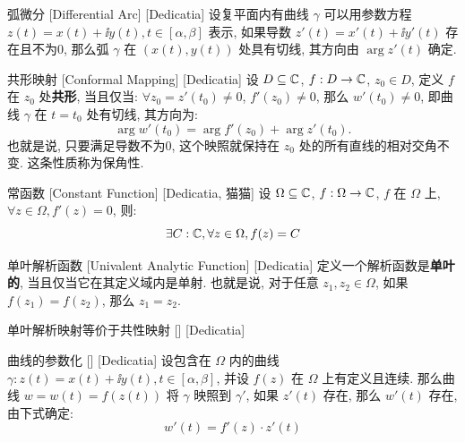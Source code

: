         \begin{dfn}
            {弧微分}
            [Differential Arc]
            [Dedicatia]
            设复平面内有曲线 \(\gamma\) 可以用参数方程 \(z(t)=x(t)+\ii y(t), t\in[\alpha,\beta]\) 表示, 如果导数 \(z'(t)=x'(t)+\ii y'(t)\) 存在且不为0, 那么弧 \(\gamma\) 在 \((x(t),y(t))\) 处具有切线, 其方向由 \(\arg z'(t)\) 确定. 
        \end{dfn}

        \begin{dfn}
            {共形映射}
            [Conformal Mapping]
            [Dedicatia]
            设 \(D\subseteq\operatorname{\mathbb{C}}\), \(f:D\to\operatorname{\mathbb{C}}\), \(z_0\in D\), 定义 \(f\) 在 \(z_0\) 处\textbf{共形}, 当且仅当: 
            \(\forall z_0=z'(t_0)\neq 0\),  \(f'(z_0)\neq 0\), 那么 \(w'(t_0)\neq 0\), 即曲线 \(\gamma\) 在 \(t=t_0\) 处有切线, 其方向为: 
            \[\arg w'(t_0)=\arg f'(z_0)+\arg z'(t_0).\]
            也就是说, 只要满足导数不为0, 这个映照就保持在 \(z_0\) 处的所有直线的相对交角不变. 这条性质称为保角性. 
        \end{dfn}

        \begin{ppt}
            {常函数}
            [Constant Function]
            [Dedicatia, 猫猫]
            设 \(\Omega\subseteq\operatorname{\mathbb{C}}\), \(f:\Omega\to\operatorname{\mathbb{C}}\), \(f\) 在 \(\Omega\) 上\Analytic{}, \(\forall z\in\Omega, f'(z)=0\), 则: 
            \[\exists C:\operatorname{\mathbb{C}}, \forall z\in\Omega, f(z)=C\]
        \end{ppt} 
        
        \begin{dfn}
            {单叶解析函数}
            [Univalent Analytic Function]
            [Dedicatia]
            定义一个解析函数是\textbf{单叶的}, 当且仅当它在其定义域内是单射. 也就是说, 对于任意 \(z_1,z_2\in\Omega\), 如果 \(f(z_1)=f(z_2)\), 那么 \(z_1=z_2\).
        \end{dfn}

        \begin{thm}
            {单叶解析映射等价于共性映射}
            []
            [Dedicatia]
            \bysorry
        \end{thm}

        \begin{thm}
            {曲线的参数化}
            []
            [Dedicatia]
            设包含在 \(\Omega\) 内的曲线 \(\gamma:z(t)=x(t)+\ii y(t), t\in[\alpha,\beta]\), 并设 \(f(z)\) 在 \(\Omega\) 上有定义且连续. 那么曲线 \(w=w(t)=f(z(t))\) 将 \(\gamma\) 映照到 \(\gamma'\), 如果 \(z'(t)\) 存在, 那么 \(w'(t)\) 存在, 由下式确定: 
            \[w'(t)=f'(z)\cdot z'(t)\]
        \end{thm}

